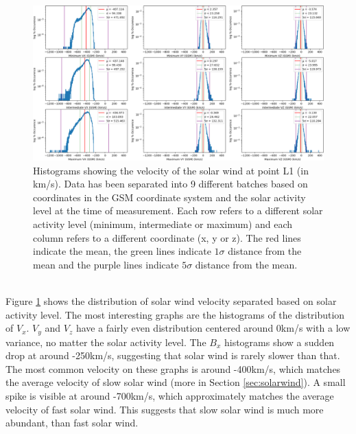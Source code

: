 \documentclass[11pt]{article}
\begin{document}
        \begin{figure}[t!]
            \centering
            \includegraphics[width=\textwidth]{fig_theory/hist_sw_velocity.png}
            \caption{Histograms showing the velocity of the solar wind at point L1 (in km/s). Data has been separated into 9 different batches based on coordinates in the GSM coordinate system and the solar activity level at the time of measurement. Each row refers to a different solar activity level (minimum, intermediate or maximum) and each column refers to a different coordinate (x, y or z). The red lines indicate the mean, the green lines indicate $1\sigma$ distance from the mean and the purple lines indicate $5\sigma$ distance from the mean.}
            \label{fig:hist_sw}
        \end{figure}\\
        Figure \ref{fig:hist_sw} shows the distribution of solar wind velocity separated based on solar activity level. The most interesting graphs are the histograms of the distribution of $V_x$. $V_y$ and $V_z$ have a fairly even distribution centered around 0km/s with a low variance, no matter the solar activity level. The $B_x$ histograms show a sudden drop at around -250km/s, suggesting that solar wind is rarely slower than that. The most common velocity on these graphs is around -400km/s, which matches the average velocity of slow solar wind\cite{2001russell} (more in Section \ref{sec:solarwind}). A small spike is visible at around -700km/s, which approximately matches the average velocity of fast solar wind\cite{2001russell}. This suggests that slow solar wind is much more abundant, than fast solar wind.
\end{document}
